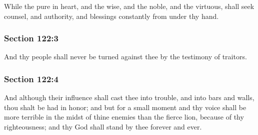 		While the pure in heart, and the wise, and the noble, and the virtuous, shall seek counsel, and authority, and blessings constantly from under thy hand.


	\subsubsection{Section 122:3} %
		\label{DC122-3}

		And thy people shall never be turned against thee by the testimony of traitors.


	\subsubsection{Section 122:4} %
		\label{DC122-4}

		And although their influence shall cast thee into trouble, and into bars and walls, thou shalt be had in honor; and but for a small moment and thy voice shall be more terrible in the midst of thine enemies than the fierce lion, because of thy righteousness; and thy God shall stand by thee forever and ever.\phantom{.}


